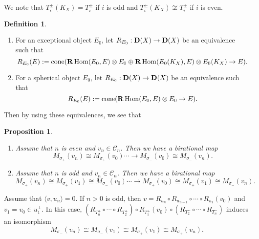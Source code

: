 \documentclass[leqno,11pt]{amsart}
\def\Hom{\mathop{\mathrm{Hom}}\nolimits}
\newtheorem{Prop}[Thm]{Proposition}
\theoremstyle{definition}
\newtheorem{Def}[Thm]{Definition}
\def\CC{\ensuremath{\mathcal C}}
\begin{document}
We note that $T_i^\pm (K_X)=T_i^\pm$ if $i$ is odd and
$T_i^\pm (K_X) \not \cong T_i^\pm$ if $i$ is even.

\begin{Def}
\begin{enumerate}
\item[(1)]
For an exceptional object $E_0$,
let $R_{E_0}:{\bf D}(X) \to {\bf D}(X)$ be an equivalence such that
\begin{equation}
R_{E_0}(E):=
\mathrm{cone}({\bf R}\Hom(E_0,E)\otimes E_0 \oplus 
 {\bf R}\Hom(E_0(K_X),E)\otimes E_0(K_X) \to E).
\end{equation}
\item[(2)]
For a spherical object $E_0$,
let $R_{E_0}:{\bf D}(X) \to {\bf D}(X)$ be an equivalence such that
\begin{equation}
R_{E_0}(E):=\mathrm{cone}({\bf R}\Hom(E_0,E)\otimes E_0  \to E).
\end{equation}
\end{enumerate}
\end{Def}
Then by using these equivalences, we see that


\begin{Prop}
\begin{enumerate}
\item[(1)]
Assume that $n$ is even and $v_n \in \CC_n$.
Then we have a birational map
\begin{equation}
M_{\sigma_+}(v_n) \cong M_{\sigma_+}(v_0) \cdots \to M_{\sigma_-}(v_0)
\cong M_{\sigma_-}(v_n).
\end{equation}
\item[(2)]
Assume that $n$ is odd and $v_n \in \CC_n$.
Then we have a birational map
\begin{equation}
M_{\sigma_+}(v_n) \cong M_{\sigma_+}(v_1) \cong M_{\sigma_-}(v_0) 
\cdots \to M_{\sigma_+}(v_0) \cong M_{\sigma_+}(v_1)
\cong M_{\sigma_-}(v_n).
\end{equation}
\end{enumerate}
\end{Prop}

Assume that $\langle v, u_n \rangle=0$.
If $n>0$ is odd, then 
$v= R_{u_n} \circ R_{u_{n-1}} \circ \cdots \circ R_{u_1}(v_0)$ and
$v_1=v_0 \in u_1^\perp$.
In this case, 
$(R_{T_n^+}  \circ \cdots \circ  R_{T_{2}^+}) \circ R_{T_1^+}(v_0)
\circ (R_{T_2^-} \circ \cdots \circ R_{T_n^-})$ induces
an isomorphism
\begin{equation}
M_{\sigma_-}(v_{n}) \cong M_{\sigma_-}(v_1) \cong M_{\sigma_+}(v_1) 
\cong M_{\sigma_+}(v_{n}).
\end{equation}
\end{document}
